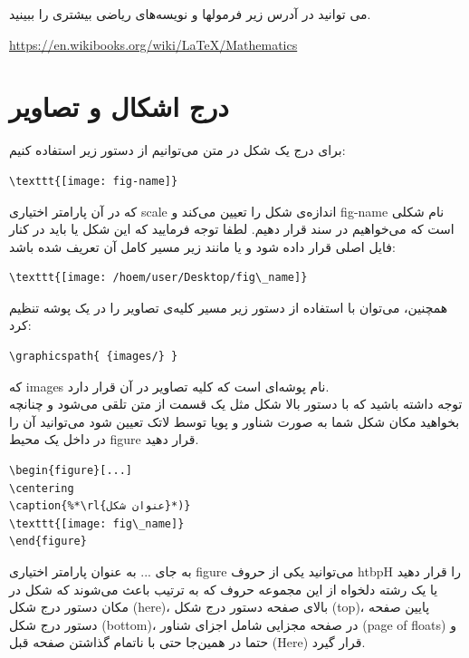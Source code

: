  می توانید در آدرس زیر فرمولها و نویسه‌های ریاضی بیشتری را ببینید. 
 \begin{latin}
\url{https://en.wikibooks.org/wiki/LaTeX/Mathematics}
\end{latin}
\section{درج اشکال و تصاویر}\label{seq:3.3}
برای درج یک شکل در متن می‌توانیم از دستور زیر استفاده کنیم:
\begin{latin}
\begin{lstlisting}[style=Tex]
\texttt{[image: fig-name]}‎
\end{lstlisting}
\end{latin}

که در آن پارامتر اختیاری scale اندازه‌ی شکل را تعیین می‌کند و  fig-name نام شکلی است که می‌خواهیم در سند قرار دهیم. لطفا توجه فرمایید که این شکل یا باید در کنار فایل اصلی قرار داده شود و یا مانند زیر مسیر کامل آن تعریف شده باشد:
\begin{latin}
\begin{lstlisting}[style=Tex]
\texttt{[image: /hoem/user/Desktop/fig\_name]}‎
\end{lstlisting}
\end{latin}
همچنین، می‌توان با استفاده از دستور زیر مسیر کلیه‌ی تصاویر را در یک پوشه تنظیم کرد:
\begin{latin}
\begin{lstlisting}
\graphicspath{ {images/} }
\end{lstlisting}
\end{latin}
که images نام پوشه‌ای است که کلیه تصاویر در آن قرار دارد.\\
توجه داشته باشید که با دستور بالا شکل مثل یک قسمت از متن تلقی می‌شود و چنانچه‌ بخواهید مکان شکل شما به صورت شناور و پویا توسط لاتک تعیین شود می‌توانید آن را در داخل یک محیط figure قرار دهید.
\begin{latin}
\begin{lstlisting}[style=Tex]
\begin{figure}[...]
\centering
\caption{%*\rl{عنوان شکل}*)}
‎\texttt{[image: fig\_name]}‎
\end{figure} 
\end{lstlisting}
\end{latin}

به جای ... به عنوان پارامتر اختیاری figure می‌توانید یکی از حروف htbpH را قرار دهید یا یک رشته دلخواه از این مجموعه حروف که به ترتیب باعث می‌شوند که شکل در مکان دستور درج شکل (here)، بالای صفحه دستور درج شکل (top)، پایین صفحه دستور درج شکل (bottom)، در صفحه مجزایی شامل اجزای شناور (page of floats) و حتما در همین‌جا حتی با ناتمام گذاشتن صفحه قبل (Here) قرار گیرد.


